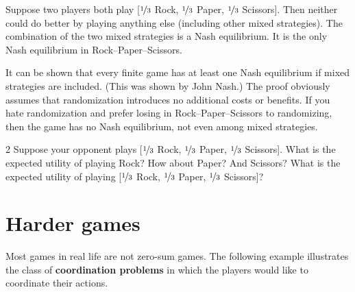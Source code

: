 Suppose two players both play [$\nicefrac{1}{3}$ Rock, $\nicefrac{1}{3}$ Paper,
$\nicefrac{1}{3}$ Scissors]. Then neither could do better by playing anything
else (including other mixed strategies). The combination of the two mixed
strategies is a Nash equilibrium. It is the only Nash equilibrium in
Rock--Paper--Scissors.

It can be shown that every finite game has at least one Nash equilibrium if
mixed strategies are included. (This was shown by John Nash.) The proof
obviously assumes that randomization introduces no additional costs or benefits.
If you hate randomization and prefer losing in Rock--Paper--Scissors to
randomizing, then the game has no Nash equilibrium, not even among mixed
strategies.

\begin{exercise}{2}
  Suppose your opponent plays [$\nicefrac{1}{3}$ Rock, $\nicefrac{1}{3}$ Paper,
  $\nicefrac{1}{3}$ Scissors]. What is the expected utility of playing Rock? How
  about Paper? And Scissors? What is the expected utility of playing
  [$\nicefrac{1}{3}$ Rock, $\nicefrac{1}{3}$ Paper, $\nicefrac{1}{3}$ Scissors]?
\end{exercise}

\section{Harder games}

Most games in real life are not zero-sum games. The following example
illustrates the class of \textbf{coordination problems} in which the players
would like to coordinate their actions.

